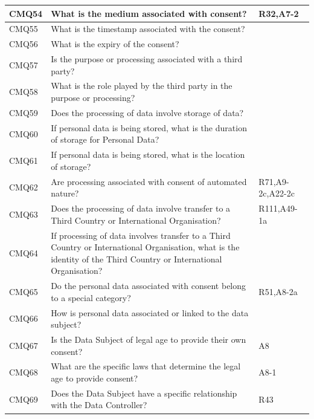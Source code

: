 \begin{table}
\begin{tabularx}{\textwidth}{|l|X|l|}
CMQ54 & What is the medium associated with consent? & R32,A7-2 \\ \hline
CMQ55 & What is the timestamp associated with the consent? &  \\ \hline
CMQ56 & What is the expiry of the consent? &  \\ \hline
CMQ57 & Is the purpose or processing associated with a third party? &  \\ \hline
CMQ58 & What is the role played by the third party in the purpose or processing? &  \\ \hline
CMQ59 & Does the processing of data involve storage of data? &  \\ \hline
CMQ60 & If personal data is being stored, what is the duration of storage for Personal Data? &  \\ \hline
CMQ61 & If personal data is being stored, what is the location of storage? &  \\ \hline
CMQ62 & Are processing associated with consent of automated nature? & R71,A9-2c,A22-2c \\ \hline
CMQ63 & Does the processing of data involve transfer to a Third Country or International Organisation? & R111,A49-1a \\ \hline
CMQ64 & If processing of data involves transfer to a Third Country or International Organisation, what is the identity of the Third Country or International Organisation? &  \\ \hline
CMQ65 & Do the personal data associated with consent belong to a special category? & R51,A8-2a \\ \hline
CMQ66 & How is personal data associated or linked to the data subject? &  \\ \hline
CMQ67 & Is the Data Subject of legal age to provide their own consent? & A8 \\ \hline
CMQ68 & What are the specific laws that determine the legal age to provide consent? & A8-1 \\ \hline
CMQ69 & Does the Data Subject have a specific relationship with the Data Controller? & R43 \\ \hline
\end{tabularx}
\end{table}
